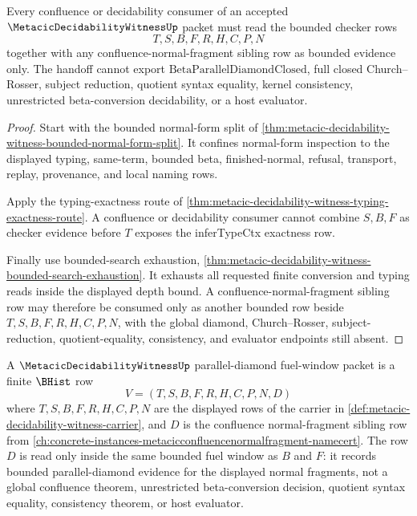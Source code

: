 \begin{theorem}
\label{thm:metacic-decidability-witness-confluence-handoff-boundary}
Every confluence or decidability consumer of an accepted $\MetacicDecidabilityWitnessUp$ packet must read the bounded checker rows
$$
T,S,B,F,R,H,C,P,N
$$
together with any confluence-normal-fragment sibling row as bounded evidence only. The handoff cannot export $\mathrm{BetaParallelDiamondClosed}$, full closed Church--Rosser, subject reduction, quotient syntax equality, kernel consistency, unrestricted beta-conversion decidability, or a host evaluator.
\end{theorem}
\begin{proof}
Start with the bounded normal-form split of \autoref{thm:metacic-decidability-witness-bounded-normal-form-split}. It confines normal-form inspection to the displayed typing, same-term, bounded beta, finished-normal, refusal, transport, replay, provenance, and local naming rows.

Apply the typing-exactness route of \autoref{thm:metacic-decidability-witness-typing-exactness-route}. A confluence or decidability consumer cannot combine $S,B,F$ as checker evidence before $T$ exposes the inferTypeCtx exactness row.

Finally use bounded-search exhaustion, \autoref{thm:metacic-decidability-witness-bounded-search-exhaustion}. It exhausts all requested finite conversion and typing reads inside the displayed depth bound. A confluence-normal-fragment sibling row may therefore be consumed only as another bounded row beside $T,S,B,F,R,H,C,P,N$, with the global diamond, Church--Rosser, subject-reduction, quotient-equality, consistency, and evaluator endpoints still absent.
\end{proof}

\begin{definition}
\label{def:metacic-parallel-diamond-fuel-window}
A $\MetacicDecidabilityWitnessUp$ parallel-diamond fuel-window packet is a finite $\BHist$ row
$$
V=(T,S,B,F,R,H,C,P,N,D)
$$
where $T,S,B,F,R,H,C,P,N$ are the displayed rows of the carrier in \autoref{def:metacic-decidability-witness-carrier}, and $D$ is the confluence normal-fragment sibling row from \autoref{ch:concrete-instances-metacicconfluencenormalfragment-namecert}. The row $D$ is read only inside the same bounded fuel window as $B$ and $F$: it records bounded parallel-diamond evidence for the displayed normal fragments, not a global confluence theorem, unrestricted beta-conversion decision, quotient syntax equality, consistency theorem, or host evaluator.
\end{definition}


